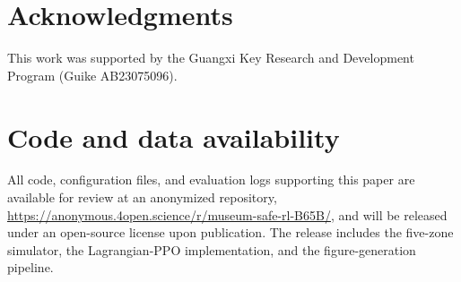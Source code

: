 \documentclass[11pt,a4paper]{article}
\begin{document}
\section*{Acknowledgments}

This work was supported by the Guangxi Key Research and Development
Program (Guike AB23075096).

\section*{Code and data availability}

All code, configuration files, and evaluation logs supporting this
paper are available for review at an anonymized repository,
\url{https://anonymous.4open.science/r/museum-safe-rl-B65B/}, and will
be released under an open-source license upon publication. The release
includes the five-zone simulator, the Lagrangian-PPO implementation,
and the figure-generation pipeline.



\end{document}
